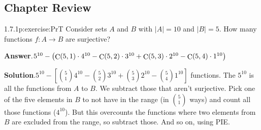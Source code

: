 \documentclass[twoside,11pt,]{book}
\newcommand{\blocktitlefont}{\relax}
\numberwithin{equation}{chapter}
\begin{document}
\subsection*{Chapter Review}
\begin{divisionsolution}{1.7.1}{}{p:exercise:PrT}%
Consider sets \(A\) and \(B\) with \(|A| = 10\) and \(|B| = 5\text{.}\) How many functions \(f: A \to B\) are surjective?%
\par\smallskip%
\noindent\textbf{\blocktitlefont Answer}.\quad{}\(5^{10}-\left(\mathop{\rm C}\nolimits\!\left(5,1\right)\cdot 4^{10}-\mathop{\rm C}\nolimits\!\left(5,2\right)\cdot 3^{10}+\mathop{\rm C}\nolimits\!\left(5,3\right)\cdot 2^{10}-\mathop{\rm C}\nolimits\!\left(5,4\right)\cdot 1^{10}\right)\)%
\par\smallskip%
\noindent\textbf{\blocktitlefont Solution}.\quad{}\(5^{10} - \left[{5 \choose 1}4^{10} - {5 \choose 2}3^{10} + {5 \choose 3}2^{10} - {5 \choose 4}1^{10}\right]\) functions. The \(5^{10}\) is all the functions from \(A\) to \(B\text{.}\) We subtract those that aren't surjective. Pick one of the five elements in \(B\) to not have in the range (in \({5 \choose 1}\) ways) and count all those functions (\(4^{10}\)). But this overcounts the functions where two elements from \(B\) are excluded from the range, so subtract those. And so on, using PIE.%
\end{divisionsolution}%
\end{document}
